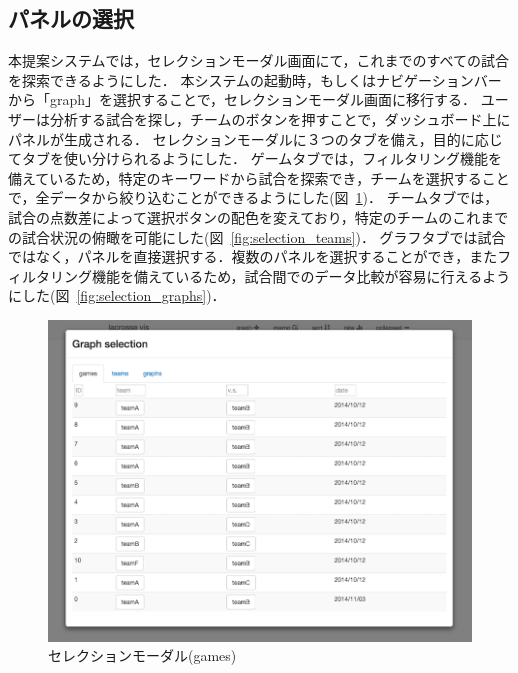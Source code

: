 \documentclass[sotsuron]{kuee}
\begin{document}
		\subsection{パネルの選択}
			本提案システムでは，セレクションモーダル画面にて，これまでのすべての試合を探索できるようにした．
			本システムの起動時，もしくはナビゲーションバーから「graph」を選択することで，セレクションモーダル画面に移行する．
			ユーザーは分析する試合を探し，チームのボタンを押すことで，ダッシュボード上にパネルが生成される．
			セレクションモーダルに３つのタブを備え，目的に応じてタブを使い分けられるようにした．
			ゲームタブでは，フィルタリング機能を備えているため，特定のキーワードから試合を探索でき，チームを選択することで，全データから絞り込むことができるようにした(図~\ref{fig:selection_games})．
			チームタブでは，試合の点数差によって選択ボタンの配色を変えており，特定のチームのこれまでの試合状況の俯瞰を可能にした(図~\ref{fig:selection_teams})．
			グラフタブでは試合ではなく，パネルを直接選択する．複数のパネルを選択することができ，またフィルタリング機能を備えているため，試合間でのデータ比較が容易に行えるようにした(図~\ref{fig:selection_graphs})．
			\begin{figure}
				\begin{center}
					\includegraphics[width=\linewidth]{./png/selection_games.png}
				\end{center}
				\caption{セレクションモーダル(games)}
		  		\label{fig:selection_games}
			\end{figure}
\end{document}
